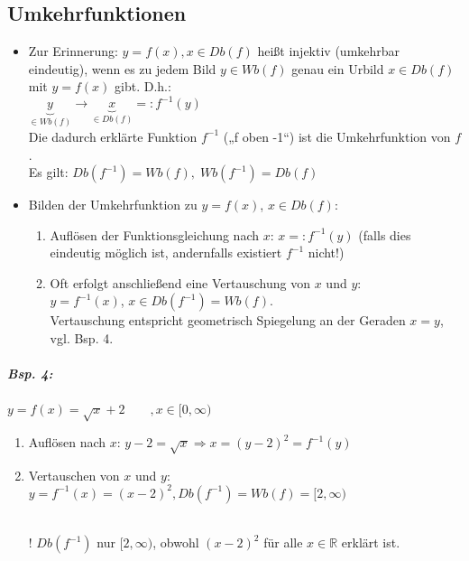 \subsection{Umkehrfunktionen}
\begin{itemize}
\item Zur Erinnerung: $y=f(x), x\in Db(f)$ heißt injektiv (umkehrbar eindeutig), wenn es zu jedem Bild $y \in Wb(f)$ genau ein Urbild $x\in Db(f)$ mit $y=f(x)$ gibt. D.h.:\\
$\underbrace{y}_{\in Wb(f)} \to \underbrace{x}_{\in Db(f)} =: f^{-1}(y)$\\
Die dadurch erklärte Funktion $f^{-1}$ („f oben -1“) ist die Umkehrfunktion von $f$.\\
Es gilt: $\boxed{Db\left(f^{-1}\right) = Wb(f)}, \; Wb\left( f^{-1}\right)= Db(f)$
\item Bilden der Umkehrfunktion zu $y=f(x)$, $x \in Db(f)$:
\begin{enumerate}
\item Auflösen der Funktionsgleichung nach $x$: $x=:f^{-1}(y)$ (falls dies eindeutig möglich ist, andernfalls existiert $f^{-1}$ nicht!)
\item Oft erfolgt anschließend eine Vertauschung von $x$ und $y$:\\
$y=f^{-1}(x)$, $x \in Db(f^{-1})=Wb(f)$.\\
Vertauschung entspricht geometrisch Spiegelung an der Geraden $x=y$, vgl. Bsp. 4.
\end{enumerate}
\end{itemize}
\subparagraph{Bsp. 4:} \parskp
$y=f(x)=\sqrt{x}+2 \qquad , x \in [0,\infty)$
\begin{enumerate}
\item Auflösen nach $x$: $y-2=\sqrt{x}\Rightarrow x=(y-2)^2=f^{-1}(y)$
\item Vertauschen von $x$ und $y$: $y=f^{-1}(x)=(x-2)^2, Db(f^{-1})=Wb(f)=[2,\infty)$\\
\\
! $Db(f^{-1})$ nur $[2,\infty)$, obwohl $(x-2)^2$ für alle $x \in \mathbb{R}$ erklärt ist.
\end{enumerate}

